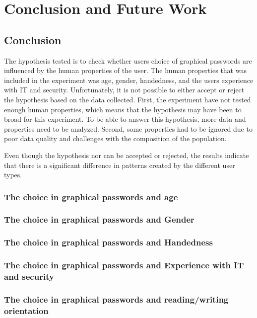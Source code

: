 \chapter{Conclusion and Future Work}\label{chap:conclusion}
  

  \clearpage
  \section{Conclusion}
    
    The hypothesis tested is to check whether users choice of graphical passwords are influenced by the human properties of the user. The human properties that was included in the experiment was age, gender, handedness, and the users experience with IT and security. 
    Unfortunately, it is not possible to either accept or reject the hypothesis based on the data collected. First, the experiment have not tested enough human properties, which means that the hypothesis may have been to broad for this experiment. To be able to answer this hypothesis, more data and properties need to be analyzed. Second, some properties had to be ignored due to poor data quality and challenges with the composition of the population.

    Even though the hypothesis nor can be accepted or rejected, the results indicate that there is a significant difference in patterns created by the different user types. 


    \subsection*{The choice in graphical passwords and age} 

    \subsection*{The choice in graphical passwords and Gender}

    \subsection*{The choice in graphical passwords and Handedness}

    \subsection*{The choice in graphical passwords and Experience with IT and security}

    \subsection*{The choice in graphical passwords and reading/writing orientation}

